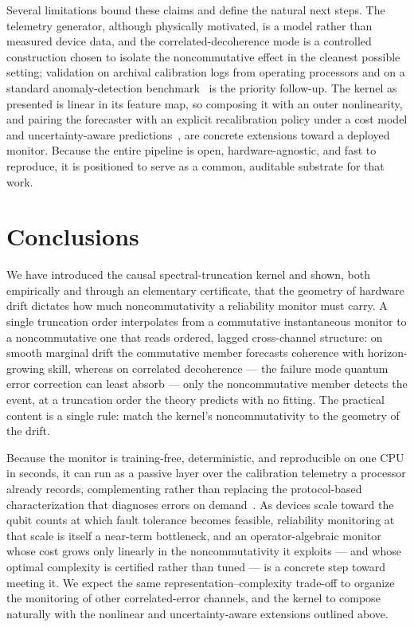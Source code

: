 \documentclass[
  aps,
  prresearch,
  reprint,
  amsmath,
  amssymb,
  nofootinbib,
  floatfix,
]{revtex4-2}
\begin{document}
Several limitations bound these claims and define the natural next steps. The
telemetry generator, although physically motivated, is a model rather than measured
device data, and the correlated-decoherence mode is a controlled construction chosen
to isolate the noncommutative effect in the cleanest possible setting; validation on
archival calibration logs from operating processors and on a standard
anomaly-detection benchmark~\citep{lavin2015nab} is the priority follow-up. The
kernel as presented is linear in its feature map, so composing it with an outer
nonlinearity, and pairing the forecaster with an explicit recalibration policy under
a cost model and uncertainty-aware predictions~\citep{gal2016dropout}, are concrete
extensions toward a deployed monitor. Because the entire pipeline is open,
hardware-agnostic, and fast to reproduce, it is positioned to serve as a common,
auditable substrate for that work.

\section{Conclusions}

We have introduced the causal spectral-truncation kernel and shown, both empirically
and through an elementary certificate, that the geometry of hardware drift dictates
how much noncommutativity a reliability monitor must carry. A single truncation order
interpolates from a commutative instantaneous monitor to a noncommutative one that
reads ordered, lagged cross-channel structure: on smooth marginal drift the
commutative member forecasts coherence with horizon-growing skill, whereas on
correlated decoherence --- the failure mode quantum error correction can least absorb
--- only the noncommutative member detects the event, at a truncation order the
theory predicts with no fitting. The practical content is a single rule: match the
kernel's noncommutativity to the geometry of the drift.

Because the monitor is training-free, deterministic, and reproducible on one CPU in
seconds, it can run as a passive layer over the calibration telemetry a processor
already records, complementing rather than replacing the protocol-based
characterization that diagnoses errors on
demand~\citep{magesan2011rb,proctor2020drift,sarovar2020crosstalk}. As devices scale
toward the qubit counts at which fault tolerance becomes feasible, reliability
monitoring at that scale is itself a near-term bottleneck, and an operator-algebraic
monitor whose cost grows only linearly in the noncommutativity it exploits --- and
whose optimal complexity is certified rather than tuned --- is a concrete step toward
meeting it. We expect the same representation--complexity trade-off to organize the
monitoring of other correlated-error channels, and the kernel to compose naturally
with the nonlinear and uncertainty-aware extensions outlined above.
\end{document}
